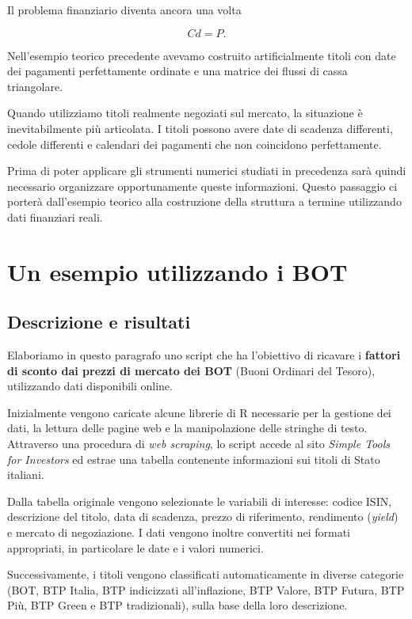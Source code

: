 Il problema finanziario diventa ancora una volta

\begin{equation*}
    Cd=P.
\end{equation*}

Nell'esempio teorico precedente avevamo costruito artificialmente
titoli con date dei pagamenti perfettamente ordinate e una matrice
dei flussi di cassa triangolare.

Quando utilizziamo titoli realmente negoziati sul mercato, la
situazione è inevitabilmente più articolata. I titoli possono avere
date di scadenza differenti, cedole differenti e calendari dei
pagamenti che non coincidono perfettamente.

Prima di poter applicare gli strumenti numerici studiati in precedenza
sarà quindi necessario organizzare opportunamente queste
informazioni.
Questo passaggio ci porterà dall'esempio teorico alla costruzione
della struttura a termine utilizzando dati finanziari reali.

\section{Un esempio utilizzando i BOT}

\subsection{Descrizione e risultati}
Elaboriamo in questo paragrafo uno script che ha l'obiettivo di ricavare i \textbf{fattori di sconto dai prezzi di mercato dei BOT} (Buoni Ordinari del Tesoro), utilizzando dati disponibili online.

Inizialmente vengono caricate alcune librerie di R necessarie per la gestione dei dati, la lettura delle pagine web e la manipolazione delle stringhe di testo. Attraverso una procedura di \textit{web scraping}, lo script accede al sito \textit{Simple Tools for Investors} ed estrae una tabella contenente informazioni sui titoli di Stato italiani.

Dalla tabella originale vengono selezionate le variabili di interesse: codice ISIN, descrizione del titolo, data di scadenza, prezzo di riferimento, rendimento (\textit{yield}) e mercato di negoziazione. I dati vengono inoltre convertiti nei formati appropriati, in particolare le date e i valori numerici.

Successivamente, i titoli vengono classificati automaticamente in diverse categorie (BOT, BTP Italia, BTP indicizzati all'inflazione, BTP Valore, BTP Futura, BTP Più, BTP Green e BTP tradizionali), sulla base della loro descrizione.

